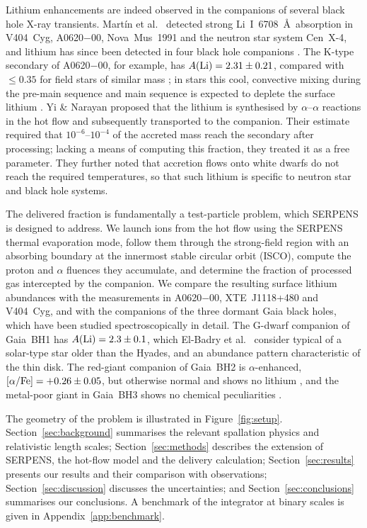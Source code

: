 \documentclass[twocolumn,showpacs,preprintnumbers,amsmath,amssymb]{revtex4}
\begin{document}
Lithium enhancements are indeed observed in the companions of several black hole X-ray transients. Mart\'in et al.\ \cite{Martin1992,Martin1994} detected strong Li~I~6708~\AA\ absorption in V404~Cyg, A0620$-$00, Nova~Mus~1991 and the neutron star system Cen~X-4, and lithium has since been detected in four black hole companions \cite{Casares2007}. The K-type secondary of A0620$-$00, for example, has $A({\rm Li})=2.31\pm0.21$, compared with $\le 0.35$ for field stars of similar mass \cite{GonzalezHernandez2004}; in stars this cool, convective mixing during the pre-main sequence and main sequence is expected to deplete the surface lithium \cite{GonzalezHernandez2004}. Yi \& Narayan \cite{YiNarayan1997} proposed that the lithium is synthesised by $\alpha$--$\alpha$ reactions in the hot flow and subsequently transported to the companion. Their estimate required that $10^{-6}$--$10^{-4}$ of the accreted mass reach the secondary after processing; lacking a means of computing this fraction, they treated it as a free parameter. They further noted that accretion flows onto white dwarfs do not reach the required temperatures, so that such lithium is specific to neutron star and black hole systems.

The delivered fraction is fundamentally a test-particle problem, which SERPENS is designed to address. We launch ions from the hot flow using the SERPENS thermal evaporation mode, follow them through the strong-field region with an absorbing boundary at the innermost stable circular orbit (ISCO), compute the proton and $\alpha$ fluences they accumulate, and determine the fraction of processed gas intercepted by the companion. We compare the resulting surface lithium abundances with the measurements in A0620$-$00, XTE~J1118+480 and V404~Cyg, and with the companions of the three dormant Gaia black holes, which have been studied spectroscopically in detail. The G-dwarf companion of Gaia~BH1 has $A({\rm Li}) = 2.3\pm0.1$, which El-Badry et al.\ \cite{ElBadry_2023} consider typical of a solar-type star older than the Hyades, and an abundance pattern characteristic of the thin disk. The red-giant companion of Gaia~BH2 is $\alpha$-enhanced, $[\alpha/{\rm Fe}]=+0.26\pm0.05$, but otherwise normal and shows no lithium \cite{ElBadry2023BH2}, and the metal-poor giant in Gaia~BH3 shows no chemical peculiarities \cite{Panuzzo2024,Hackshaw2025}.

The geometry of the problem is illustrated in Figure~\ref{fig:setup}. Section~\ref{sec:background} summarises the relevant spallation physics and relativistic length scales; Section~\ref{sec:methods} describes the extension of SERPENS, the hot-flow model and the delivery calculation; Section~\ref{sec:results} presents our results and their comparison with observations; Section~\ref{sec:discussion} discusses the uncertainties; and Section~\ref{sec:conclusions} summarises our conclusions. A benchmark of the integrator at binary scales is given in Appendix~\ref{app:benchmark}.
\end{document}
